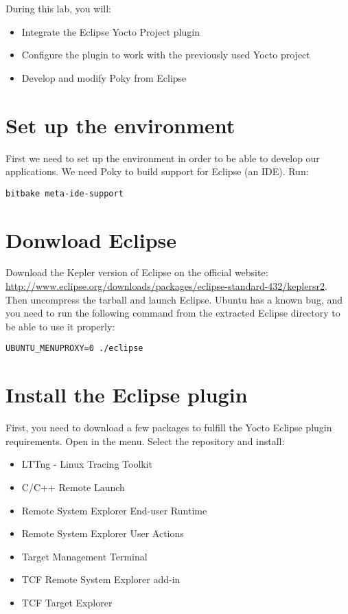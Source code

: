 
During this lab, you will:
\begin{itemize}
  \item Integrate the Eclipse Yocto Project plugin
  \item Configure the plugin to work with the previously used Yocto project
  \item Develop and modify Poky from Eclipse
\end{itemize}

\section{Set up the environment}

First we need to set up the environment in order to be able to develop our
applications. We need Poky to build support for Eclipse (an IDE). Run:

\begin{verbatim}
bitbake meta-ide-support
\end{verbatim}

\section{Donwload Eclipse}

Download the Kepler version of Eclipse on the official website:
\url{http://www.eclipse.org/downloads/packages/eclipse-standard-432/keplersr2}.
Then uncompress the tarball and launch Eclipse. Ubuntu has a known bug, and
you need to run the following command from the extracted Eclipse directory to be
able to use it properly:
\begin{verbatim}
UBUNTU_MENUPROXY=0 ./eclipse
\end{verbatim}

\section{Install the Eclipse plugin}

First, you need to download a few packages to fulfill the Yocto
Eclipse plugin requirements. Open  in the
 menu. Select the  repository and install:
\begin{itemize}
  \item LTTng - Linux Tracing Toolkit
  \item C/C++ Remote Launch
  \item Remote System Explorer End-user Runtime
  \item Remote System Explorer User Actions
  \item Target Management Terminal
  \item TCF Remote System Explorer add-in
  \item TCF Target Explorer
\end{itemize}

